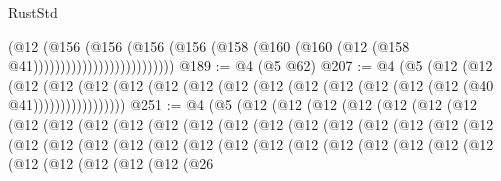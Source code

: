 \begin{lexlean}{RustStd}
\begin{coremodule}
                                    (@12
                                      (@156
                                        (@156
                                          (@156
                                            (@156
                                              (@158
                                                (@160 (@160 (@12 (@158 @41))))))))))))))))))))))))))
@189 := @4 (@5 @62)
@207 := @4
    (@5
      (@12
        (@12
          (@12 (@12 (@12 (@12 (@12 (@12 (@12 (@12 (@12 (@12 (@12 (@12 (@12 (@40 @41)))))))))))))))))
@251 := @4
    (@5
      (@12
        (@12
          (@12
            (@12
              (@12
                (@12
                  (@12
                    (@12
                      (@12
                        (@12
                          (@12
                            (@12
                              (@12
                                (@12
                                  (@12
                                    (@12
                                      (@12
                                        (@12
                                          (@12
                                            (@12
                                              (@12
                                                (@12
                                                  (@12
                                                    (@12
                                                      (@12
                                                        (@12
                                                          (@12
                                                            (@12
                                                              (@12
                                                                (@12
                                                                  (@12
                                                                    (@12
                                                                      (@12
                                                                        (@12
                                                                          (@12
                                                                            (@12
                                                                              (@12
                                                                                (@12
                                                                                  (@12
                                                                                    (@12
                                                                                      (@26

\end{coremodule}
\end{lexlean}
